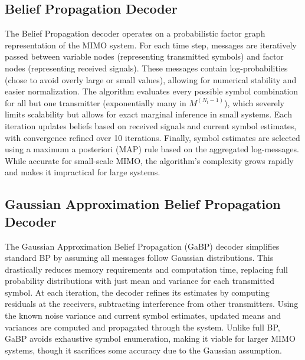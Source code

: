 \documentclass[conference]{IEEEtran}
\begin{document}
\subsection{Belief Propagation Decoder}
The Belief Propagation decoder operates on a probabilistic factor graph representation of the MIMO system. For each time step, messages are iteratively passed between variable nodes (representing transmitted symbols) and factor nodes (representing received signals). These messages contain log-probabilities (chose to avoid overly large or small values), allowing for numerical stability and easier normalization. The algorithm evaluates every possible symbol combination for all but one transmitter (exponentially many in $M^(N_t - 1)$), which severely limits scalability but allows for exact marginal inference in small systems. Each iteration updates beliefs based on received signals and current symbol estimates, with convergence refined over 10 iterations. Finally, symbol estimates are selected using a maximum a posteriori (MAP) rule based on the aggregated log-messages. While accurate for small-scale MIMO, the algorithm's complexity grows rapidly and makes it impractical for large systems.

\subsection{Gaussian Approximation Belief Propagation Decoder}
The Gaussian Approximation Belief Propagation (GaBP) decoder simplifies standard BP by assuming all messages follow Gaussian distributions. This drastically reduces memory requirements and computation time, replacing full probability distributions with just mean and variance for each transmitted symbol. At each iteration, the decoder refines its estimates by computing residuals at the receivers, subtracting interference from other transmitters. Using the known noise variance and current symbol estimates, updated means and variances are computed and propagated through the system. Unlike full BP, GaBP avoids exhaustive symbol enumeration, making it viable for larger MIMO systems, though it sacrifices some accuracy due to the Gaussian assumption.
\end{document}
